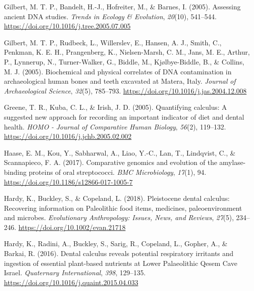 \documentclass[
  b5paper,
]{book}
\newlength{\cslhangindent}
\newlength{\cslentryspacingunit} %
\newenvironment{CSLReferences}[2] %
 {%
  \setlength{\parindent}{0pt}
  \ifodd #1
  \let\oldpar\par
  \def\par{\hangindent=\cslhangindent\oldpar}
  \fi
  \setlength{\parskip}{#2\cslentryspacingunit}
 }%
 {}
\begin{document}
\begin{CSLReferences}{1}{0}
\leavevmode{}%
Gilbert, M. T. P., Bandelt, H.-J., Hofreiter, M., \& Barnes, I. (2005).
Assessing ancient {DNA} studies. \emph{Trends in Ecology \& Evolution},
\emph{20}(10), 541--544.
\url{https://doi.org/10.1016/j.tree.2005.07.005}

\leavevmode{}%
Gilbert, M. T. P., Rudbeck, L., Willerslev, E., Hansen, A. J., Smith,
C., Penkman, K. E. H., Prangenberg, K., Nielsen-Marsh, C. M., Jans, M.
E., Arthur, P., Lynnerup, N., Turner-Walker, G., Biddle, M.,
Kjølbye-Biddle, B., \& Collins, M. J. (2005). Biochemical and physical
correlates of {DNA} contamination in archaeological human bones and
teeth excavated at {Matera}, {Italy}. \emph{Journal of Archaeological
Science}, \emph{32}(5), 785--793.
\url{https://doi.org/10.1016/j.jas.2004.12.008}

\leavevmode{}%
Greene, T. R., Kuba, C. L., \& Irish, J. D. (2005). Quantifying
calculus: {A} suggested new approach for recording an important
indicator of diet and dental health. \emph{HOMO - Journal of Comparative
Human Biology}, \emph{56}(2), 119--132.
\url{https://doi.org/10.1016/j.jchb.2005.02.002}

\leavevmode{}%
Haase, E. M., Kou, Y., Sabharwal, A., Liao, Y.-C., Lan, T., Lindqvist,
C., \& Scannapieco, F. A. (2017). Comparative genomics and evolution of
the amylase-binding proteins of oral streptococci. \emph{BMC
Microbiology}, \emph{17}(1), 94.
\url{https://doi.org/10.1186/s12866-017-1005-7}

\leavevmode{}%
Hardy, K., Buckley, S., \& Copeland, L. (2018). Pleistocene dental
calculus: {Recovering} information on {Paleolithic} food items,
medicines, paleoenvironment and microbes. \emph{Evolutionary
Anthropology: Issues, News, and Reviews}, \emph{27}(5), 234--246.
\url{https://doi.org/10.1002/evan.21718}

\leavevmode{}%
Hardy, K., Radini, A., Buckley, S., Sarig, R., Copeland, L., Gopher, A.,
\& Barkai, R. (2016). Dental calculus reveals potential respiratory
irritants and ingestion of essential plant-based nutrients at {Lower
Palaeolithic Qesem Cave Israel}. \emph{Quaternary International},
\emph{398}, 129--135. \url{https://doi.org/10.1016/j.quaint.2015.04.033}


\end{CSLReferences}
\end{document}
